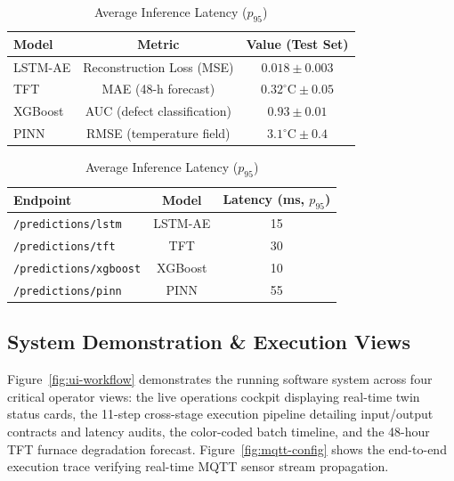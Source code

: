 \documentclass[11pt, a4paper]{article}
\begin{document}
\begin{table}[H]
    \centering
    \begin{minipage}[t]{0.48\textwidth}
        \centering
        \footnotesize
        \begin{tabular}{lcc}
            \toprule
            Model & Metric & Value (Test Set) \\
            \midrule
            LSTM-AE & Reconstruction Loss (MSE) & $0.018 \pm 0.003$ \\
            TFT    & MAE (48-h forecast)          & $0.32^{\circ}\!\text{C} \pm 0.05$ \\
            XGBoost& AUC (defect classification) & $0.93 \pm 0.01$ \\
            PINN   & RMSE (temperature field)     & $3.1^{\circ}\!\text{C} \pm 0.4$ \\
            \bottomrule
        \end{tabular}
        \caption{Core ML Model Accuracy Metrics}
        \label{tab:model-perf}
    \end{minipage}\hfill
    \begin{minipage}[t]{0.48\textwidth}
        \centering
        \footnotesize
        \begin{tabular}{lcc}
            \toprule
            Endpoint & Model & Latency (ms, $p_{95}$) \\
            \midrule
            \texttt{/predictions/lstm}      & LSTM-AE    & 15 \\
            \texttt{/predictions/tft}       & TFT        & 30 \\
            \texttt{/predictions/xgboost}   & XGBoost    & 10 \\
            \texttt{/predictions/pinn}      & PINN       & 55 \\
            \bottomrule
        \end{tabular}
        \caption{Average Inference Latency ($p_{95}$)}
        \label{tab:latency}
    \end{minipage}
\end{table}

\subsection{System Demonstration \& Execution Views}
\noindent
Figure~\ref{fig:ui-workflow} demonstrates the running software system across four critical operator views: the live operations cockpit displaying real-time twin status cards, the 11-step cross-stage execution pipeline detailing input/output contracts and latency audits, the color-coded batch timeline, and the 48-hour TFT furnace degradation forecast. Figure~\ref{fig:mqtt-config} shows the end-to-end execution trace verifying real-time MQTT sensor stream propagation.
\end{document}
